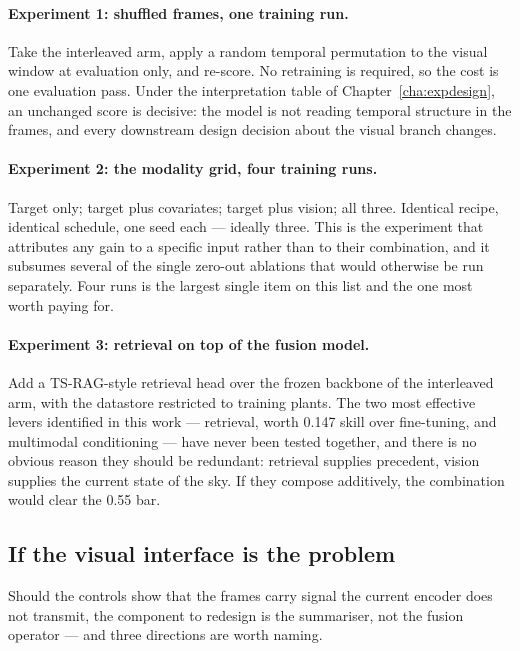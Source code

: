 \paragraph{Experiment 1: shuffled frames, one training run.} Take the interleaved arm, apply a
random temporal permutation to the visual window at evaluation only, and re-score. No
retraining is required, so the cost is one evaluation pass. Under the interpretation table of
Chapter~\ref{cha:expdesign}, an unchanged score is decisive: the model is not reading temporal
structure in the frames, and every downstream design decision about the visual branch changes.

\paragraph{Experiment 2: the modality grid, four training runs.} Target only; target plus
covariates; target plus vision; all three. Identical recipe, identical schedule, one seed each
--- ideally three. This is the experiment that attributes any gain to a specific input rather
than to their combination, and it subsumes several of the single zero-out ablations that would
otherwise be run separately. Four runs is the largest single item on this list and the one most
worth paying for.

\paragraph{Experiment 3: retrieval on top of the fusion model.} Add a TS-RAG-style retrieval
head over the frozen backbone of the interleaved arm, with the datastore restricted to
training plants. The two most effective levers identified in this work --- retrieval, worth
0.147 skill over fine-tuning, and multimodal conditioning --- have never been tested together,
and there is no obvious reason they should be redundant: retrieval supplies precedent, vision
supplies the current state of the sky. If they compose additively, the combination would clear
the 0.55 bar.

\subsection{If the visual interface is the problem}

Should the controls show that the frames carry signal the current encoder does not transmit,
the component to redesign is the summariser, not the fusion operator --- and three directions
are worth naming.

